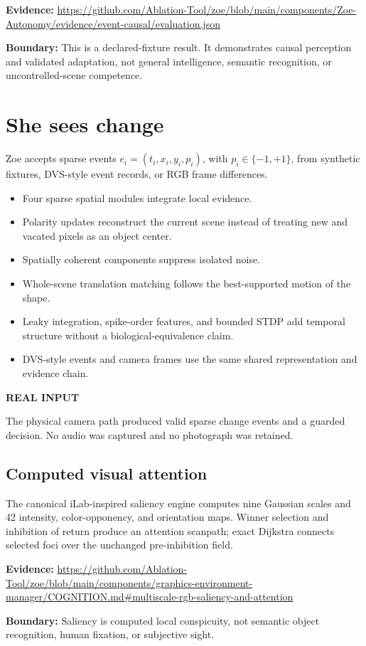 \documentclass[11pt]{article}
\newcommand{\card}[2]{\colorbox{ZoeLight}{\parbox{0.94\textwidth}{\small\textbf{\color{ZoeCyan!50!black}#1}\par\smallskip #2\par}}}
\newcommand{\boundary}[1]{\par\smallskip\small\color{ZoeGray}\textbf{Boundary:} #1\normalsize\par\smallskip}
\newcommand{\evidence}[1]{\par\smallskip\small\color{ZoeGray}\textbf{Evidence:} #1\normalsize\par\smallskip}
\begin{document}
\evidence{\url{https://github.com/Ablation-Tool/zoe/blob/main/components/Zoe-Autonomy/evidence/event-causal/evaluation.json}}
\boundary{This is a declared-fixture result. It demonstrates causal perception and validated adaptation, not general intelligence, semantic recognition, or uncontrolled-scene competence.}

\clearpage
\section{She sees change}

Zoe accepts sparse events $e_i=(t_i,x_i,y_i,p_i)$, with $p_i\in\{-1,+1\}$, from synthetic fixtures, DVS-style event records, or RGB frame differences.

\begin{itemize}
  \item Four sparse spatial modules integrate local evidence.
  \item Polarity updates reconstruct the current scene instead of treating new and vacated pixels as an object center.
  \item Spatially coherent components suppress isolated noise.
  \item Whole-scene translation matching follows the best-supported motion of the shape.
  \item Leaky integration, spike-order features, and bounded STDP add temporal structure without a biological-equivalence claim.
  \item DVS-style events and camera frames use the same shared representation and evidence chain.
\end{itemize}

\card{REAL INPUT}{The physical camera path produced valid sparse change events and a guarded decision. No audio was captured and no photograph was retained.}

\subsection{Computed visual attention}

The canonical iLab-inspired saliency engine computes nine Gaussian scales and 42 intensity, color-opponency, and orientation maps. Winner selection and inhibition of return produce an attention scanpath; exact Dijkstra connects selected foci over the unchanged pre-inhibition field.

\evidence{\url{https://github.com/Ablation-Tool/zoe/blob/main/components/graphics-environment-manager/COGNITION.md\#multiscale-rgb-saliency-and-attention}}
\boundary{Saliency is computed local conspicuity, not semantic object recognition, human fixation, or subjective sight.}
\end{document}
